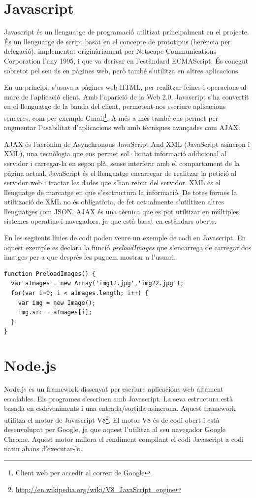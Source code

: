 \section{Javascript}

Javascript és un llenguatge de programació utiltizat principalment en el projecte. És un llenguatge de script basat en el concepte de prototipus (herència per delegació), implementat originàriament per Netscape Communications Corporation l'any 1995, i que va derivar en l'estàndard ECMAScript. És conegut sobretot pel seu ús en pàgines web, però també s'utilitza en altres aplicacions.

En un principi, s'usava a pàgines web HTML, per realitzar feines i operacions al marc de l'aplicació client. Amb l'aparició de la Web 2.0, Javascript s'ha convertit en el llenguatge de la banda del client, permetent-nos escriure aplicacions senceres, com per exemple Gmail\footnote{Client web per accedir al correu de Google}. A més a més també ens permet per augmentar l'usabilitat d'aplicacions web amb tècniques avançades com AJAX.

AJAX és l'acrònim de Asynchronous JavaScript And XML (JavaScript asíncron i XML), una tecnòlogia que ens permet sol·licitat informació addicional al servidor i carregar-la en segon plà, sense interferir amb el compartament de la pàgina actual. JavaScript és el llenguatge encarregar de realitzar la petició al servidor web i tractar les dades que s'han rebut del servidor. XML és el llenguatge de marcatge en que s'esctructura la informació. De totes formes la utiltizació de XML no és obligatòria, de fet actualmente s'utiltizen altres llenguatges com JSON. AJAX és una tècnica que es pot utiltizar en múltiples sistemes operatius i navegadors, ja que està basat en estàndars oberts.

En les següents línies de codi podeu veure un exemple de codi en Javascript. En aquest exemple es declara la funció \emph{preloadImages} que s'encarrega de carregar dos imatges per a que desprès les puguem mostrar a l'usuari.
 
\begin{lstlisting}
function PreloadImages() {
  var aImages = new Array('img12.jpg','img22.jpg');
  for(var i=0; i < aImages.length; i++) {
    var img = new Image();
    img.src = aImages[i];
  }
}
\end{lstlisting}


\section{Node.js}
\label{sec:node.js-min}
Node.js es un framework dissenyat per escriure aplicacions web altament escalables. Els programes s'escriuen amb Javascript. La seva estructura està basada en esdeveniments i una entrada/sortida asíncrona. Aquest framework utilitza el motor de Javascript V8\footnote{\url{http://en.wikipedia.org/wiki/V8_JavaScript_engine}}. El motor V8 és de codi obert i està desenvolupat per Google, ja que aquest l'utilitza al seu navegador Google Chrome. Aquest motor millora el rendiment compilant el codi Javascript a codi natiu abans d'executar-lo.

